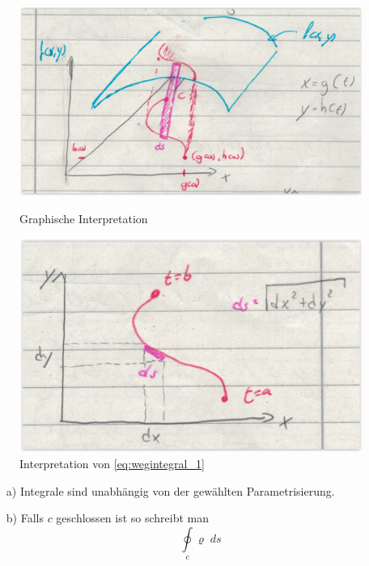 	  \begin{figure}[H] 
		\centering
		\begin{minipage}{.5\textwidth}
		  \centering
		  \includegraphics[width=0.9\linewidth]{./img/wegintegral_erster_1.png}
		  \caption{Graphische Interpretation}
		  \label{fig:wegintegral_erster_1}
		\end{minipage}%
		\begin{minipage}{.5\textwidth}
		  \centering
		  \includegraphics[width=0.8\linewidth]{./img/wegintegral_erster_2.png}
		  \caption{Interpretation von \protect\eqref{eq:wegintegral_1}}
		  \label{fig:wegintegral_erster_2}
		\end{minipage}
		\end{figure}
		\begin{bem}
			\begin{itemize}
			  \item[a) ] Integrale sind unabhängig von der gewählten Parametrisierung.
			  \item[b) ] Falls $c$ geschlossen ist so schreibt man 
				  \begin{equation}
				    \oint\limits_c \varrho \; ds
				  \end{equation}
			\end{itemize}
		\end{bem}
